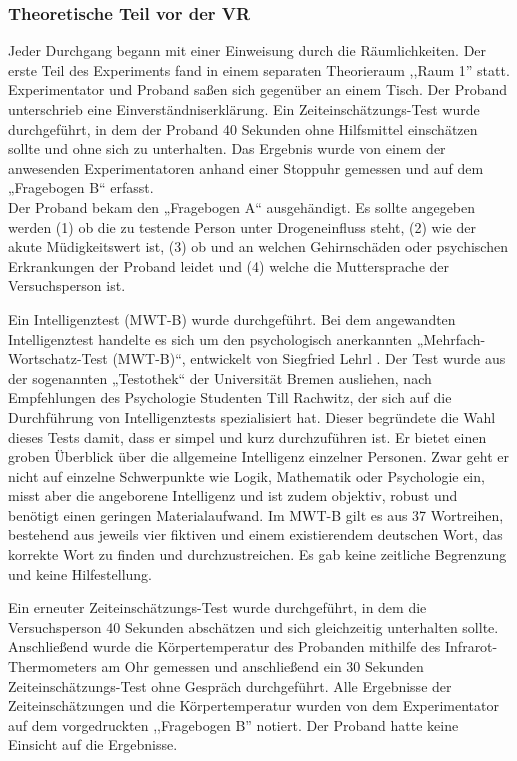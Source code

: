 \documentclass{Paper}
\begin{document}
\subsubsection{Theoretische Teil vor der VR}
Jeder Durchgang begann mit einer Einweisung durch die Räumlichkeiten. Der erste Teil des
Experiments fand in einem separaten Theorieraum ,,Raum 1'' statt. Experimentator und
Proband saßen sich gegenüber an einem Tisch. Der Proband unterschrieb eine
Einverständniserklärung. Ein Zeiteinschätzungs-Test wurde durchgeführt, in dem der
Proband 40 Sekunden ohne Hilfsmittel einschätzen sollte und ohne sich zu unterhalten.
Das Ergebnis wurde von einem der anwesenden Experimentatoren anhand einer Stoppuhr
gemessen und auf dem „Fragebogen B“ erfasst. \\
Der Proband bekam den „Fragebogen A“ ausgehändigt. Es sollte angegeben werden (1) ob die zu testende Person unter
Drogeneinfluss steht, (2) wie der akute Müdigkeitswert ist, (3) ob und an welchen
Gehirnschäden oder psychischen Erkrankungen der Proband leidet und (4) welche die
Muttersprache der Versuchsperson ist. 
\par
Ein Intelligenztest (MWT-B) wurde durchgeführt. Bei
dem angewandten Intelligenztest handelte es sich um den psychologisch anerkannten
„Mehrfach-Wortschatz-Test (MWT-B)“, entwickelt von Siegfried Lehrl \cite{MWT-B}. Der Test wurde aus
der sogenannten „Testothek“ der Universität Bremen ausliehen, nach Empfehlungen des
Psychologie Studenten Till Rachwitz, der sich auf die Durchführung von Intelligenztests
spezialisiert hat. Dieser begründete die Wahl dieses Tests damit, dass er simpel und kurz
durchzuführen ist. Er bietet einen groben Überblick über die allgemeine Intelligenz
einzelner Personen. Zwar geht er nicht auf einzelne Schwerpunkte wie Logik, Mathematik
oder Psychologie ein, misst aber die angeborene Intelligenz und ist zudem objektiv, robust
und benötigt einen geringen Materialaufwand. Im MWT-B gilt es aus 37 Wortreihen,
bestehend aus jeweils vier fiktiven und einem existierendem deutschen Wort, das korrekte
Wort zu finden und durchzustreichen. Es gab
keine zeitliche Begrenzung und keine Hilfestellung.
\par
Ein erneuter Zeiteinschätzungs-Test wurde durchgeführt, in dem die Versuchsperson 40 Sekunden abschätzen und sich gleichzeitig unterhalten sollte. \\
Anschließend wurde die Körpertemperatur des Probanden mithilfe des Infrarot-Thermometers am Ohr gemessen und anschließend ein 30 Sekunden
Zeiteinschätzungs-Test ohne Gespräch durchgeführt. Alle Ergebnisse der Zeiteinschätzungen und die
Körpertemperatur wurden von dem Experimentator auf dem vorgedruckten ,,Fragebogen B''
notiert. Der Proband hatte keine Einsicht auf die Ergebnisse.
\end{document}
